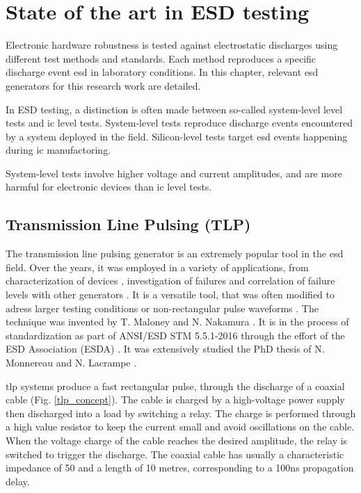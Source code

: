 \section{State of the art in ESD testing}
\label{sec:state-art-esd-testing}

Electronic hardware robustness is tested against electrostatic discharges using different test methods and standards.
Each method reproduces a specific discharge event \gls{esd} in laboratory conditions.
In this chapter, relevant \gls{esd} generators for this research work are detailed.

In ESD testing, a distinction is often made between so-called system-level level tests and \gls{ic} level tests.
System-level tests reproduce discharge events encountered by a system deployed in the field.
Silicon-level tests target \gls{esd} events happening during \gls{ic} manufactoring.

System-level tests involve higher voltage and current amplitudes, and are more harmful for electronic devices than \gls{ic} level tests.

\subsection{Transmission Line Pulsing (TLP)}

The transmission line pulsing generator is an extremely popular tool in the \gls{esd} field.
Over the years, it was employed in a variety of applications, from characterization of devices \cite{TLPforESDProtectionCz, TLPthroubleshooting}, investigation of failures \cite{tlp-application-1, tlp-application-2} and correlation of failure levels with other generators \cite{correlation-system-level-esd-tlp}.
It is a versatile tool, that was often modified to adress larger testing conditions \cite{tlp-power} or non-rectangular pulse waveforms \cite{tlp-based-hmm, my-publi-tlp-hmm}.
The technique was invented by T. Maloney and N. Nakamura \cite{TLP}.
It is in the process of standardization as part of ANSI/ESD STM 5.5.1-2016 \cite{tlp-standard} through the effort of the ESD Association (ESDA) \cite{esda}.
It was extensively studied the PhD thesis of N. Monnereau \cite{phd-monnereau} and N. Lacrampe \cite{phd-lacrampe}.

\gls{tlp} systems produce a fast rectangular pulse, through the discharge of a coaxial cable (Fig. \ref{tlp_concept}).
The cable is charged by a high-voltage power supply then discharged into a load by switching a relay.
The charge is performed through a high value resistor to keep the current small and avoid oscillations on the cable.
When the voltage charge of the cable reaches the desired amplitude, the relay is switched to trigger the discharge.
The coaxial cable has usually a characteristic impedance of 50\textOmega{} and a length of 10 metres, corresponding to a 100ns propagation delay.

